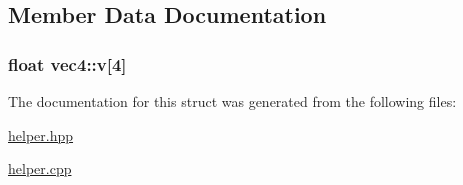 \subsection{Member Data Documentation}
\hypertarget{structvec4_a08f56ae363c0cabebd3fe446ef28e652}{
\subsubsection[{v}]{\setlength{\rightskip}{0pt plus 5cm}float vec4\+::v\mbox{[}4\mbox{]}}}\label{structvec4_a08f56ae363c0cabebd3fe446ef28e652}


The documentation for this struct was generated from the following files\+:\begin{DoxyCompactItemize}
\item 
\hyperlink{helper_8hpp}{helper.\+hpp}\item 
\hyperlink{helper_8cpp}{helper.\+cpp}\end{DoxyCompactItemize}
